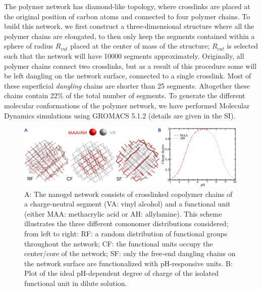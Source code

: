 The polymer network has diamond-like topology, where  crosslinks are placed at the original position of carbon atoms and connected to four polymer chains.
To build this network, we first construct a three-dimensional structure where all the polymer chains are elongated, to then only keep the segments contained within a sphere of radius $R_{cut}$ placed at the center of mass of the structure; $R_{cut}$ is selected such that the network will have 10000 segments approximately.
Originally, all polymer chains connect two crosslinks, but as a result of this procedure some will be left dangling on the network surface,  connected to a single crosslink.
Most of these superficial \emph{dangling} chains are shorter than 25 segments.
Altogether these chains contain 22\% of the total number of segments.
To generate the different molecular conformations of the polymer network, we have performed Molecular Dynamics simulations using GROMACS 5.1.2  (details are given in the SI).

 \begin{figure}[!htb]
     \centering
     \includegraphics[width=0.99\textwidth]{Figures/graphs-gel2/paper2.png}
     \caption{A: The nanogel network consists of crosslinked copolymer chains of a charge-neutral segment (VA: vinyl alcohol) and a functional unit (either MAA: methacrylic acid or AH: allylamine).
    This scheme illustrates the three different comonomer distributions considered;  from left to right: RF: a random distribution of functional groups throughout the network; CF: the functional units occupy the center/core of the network; SF: only the free-end dangling chains on the network surface are functionalized with pH-responsive units.
B: Plot of the ideal pH-dependent degree of charge of the isolated functional unit in dilute solution.}
     \label{fig:esf:gel-topologies}
 \end{figure}














